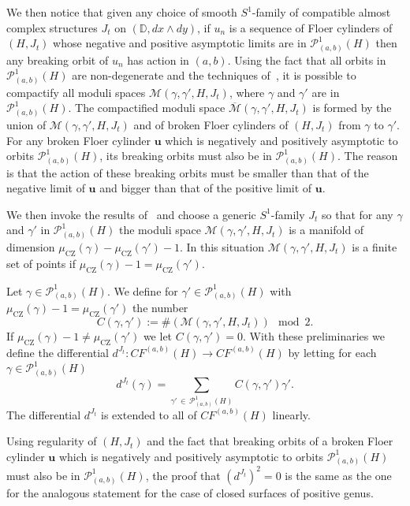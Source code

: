 \documentclass[AHL,Unicode,longabstracts,published]{cedram}
\newcommand{\D}{\mathbb{D}}
\newcommand{\rCZ}{\mathrm{CZ}}
\newcommand{\clP}{\mathcal{P}}
\newcommand{\clM}{\mathcal{M}}
\newcommand{\bfu}{\mathbf{u}}
\begin{document}
We then notice that given any choice of smooth $S^1$-family of compatible almost complex structures $J_t$ on $(\D,dx\wedge dy)$, if $u_n$ is a sequence of Floer cylinders of $(H,J_t)$ whose negative and positive asymptotic limits are in $\clP^1_{(a,b)}(H)$ then any breaking orbit of $u_n$ has action in $(a,b)$. Using the fact that all orbits in $\clP^1_{(a,b)}(H)$ are non-degenerate and the techniques of~\cite{Floer}, it is possible to compactify all moduli spaces $\clM(\gamma,\gamma',H,J_t)$, where $\gamma$ and $\gamma'$ are in $\clP^1_{(a,b)}(H)$. The compactified moduli space $\overline{\clM}(\gamma,\gamma',H,J_t)$ is formed by the union of $\clM(\gamma,\gamma',H,J_t)$ and of broken Floer cylinders of $(H,{J}_t)$ from $\gamma$ to $ \gamma'$. For any broken Floer cylinder $\bfu$ which is negatively and positively asymptotic to orbits $\clP^1_{(a,b)}(H) $, its breaking orbits must also be in $\clP^1_{(a,b)}(H) $. The reason is that the action of these breaking orbits must be smaller than that of the negative limit of $\bfu$ and bigger than that of the positive limit of $\bfu$.

We then invoke the results of~\cite{FHS} and choose a generic $S^1$-family $J_t$ so that for any $\gamma$ and $\gamma'$ in $\clP^1_{(a,b)}(H)$ the moduli space $\clM(\gamma,\gamma',H,J_t)$ is a manifold of dimension $\mu_{\rCZ}(\gamma) - \mu_{\rCZ}(\gamma')-1$. In this situation $\clM(\gamma,\gamma',H,J_t)$ is a finite set of points if $\mu_{\rCZ}(\gamma) - 1 = \mu_{\rCZ}(\gamma')$.

Let $\gamma \in \clP^1_{(a,b)}(H)$. We define for $\gamma' \in \clP^1_{(a,b)}(H)$ with $\mu_{\rCZ}(\gamma) - 1 = \mu_{\rCZ}(\gamma')$ the number
\[
C(\gamma,\gamma') := \#(\clM(\gamma,\gamma',H,J_t)) \mod 2.
\]
If $\mu_{\rCZ}(\gamma) - 1 \neq \mu_{\rCZ}(\gamma')$ we let $C(\gamma,\gamma') =0$. With these preliminaries we define the differential $d^{J_t}: CF^{(a,b)}(H) \to CF^{(a,b)}(H)$ by letting for each $\gamma \in \clP^1_{(a,b)}(H) $
\begin{equation*}
d^{J_t} (\gamma) = \sum_{\gamma'\,\in\,\clP^1_{(a,b)}(H) } C(\gamma,\gamma')\gamma'.
\end{equation*}
The differential $ d^{J_t}$ is extended to all of $CF^{(a,b)}(H)$ linearly.

Using regularity of $(H,J_t)$ and the fact that breaking orbits of a broken Floer cylinder $\bfu$ which is negatively and positively asymptotic to orbits $\clP^1_{(a,b)}(H) $ must also be in $\clP^1_{(a,b)}(H) $, the proof that $(d^{J_t})^2=0$ is the same as the one for the analogous statement for the case of closed surfaces of positive genus.
\end{document}
